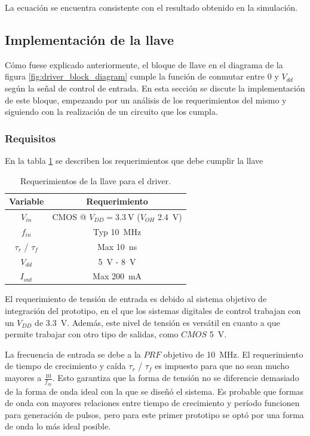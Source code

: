 La ecuación se encuentra consistente con el resultado obtenido en la simulación.

\subsection{Implementación de la llave}

Cómo fuese explicado anteriormente, el bloque de llave en el diagrama de la
figura \ref{fig:driver_block_diagram} cumple la función de conmutar entre $0$ y
$V_{dd}$ según la señal de control de entrada. En esta sección se discute la
implementación de este bloque, empezando por un análisis de los requerimientos
del mismo y siguiendo con la realización de un circuito que los cumpla.

\subsubsection{Requisitos}

En la tabla
\ref{tab:llave_requirements} se describen los requerimientos que debe cumplir la
llave

\begin{table}
\centering
\begin{tabular}{c|c}
\hline
    Variable & Requerimiento \\
\hline
    $V_{in}$                &   CMOS @ $V_{DD}=\qty{3.3}{\volt}$ ($V_{OH}$
    \qty{2.4}{\volt})     \\
    $f_{in}$                &   Typ \qty{10}{\mega\hertz} \\
    $\tau_{r}$ / $\tau_{f}$ &   Max \qty{10}{\nano\second} \\
    $V_{dd}$                &   \qty{5}{\volt} - \qty{8}{\volt} \\
    $I_{out}$               &   Max \qty{200}{\milli\ampere} \\
\hline
\end{tabular}
\caption{Requerimientos de la llave para el driver.}
\label{tab:llave_requirements}
\end{table}

El requerimiento de tensión de entrada es debido al sistema objetivo de
integración del prototipo, en el que los sistemas digitales de control trabajan
con un $V_{DD}$ de \qty{3.3}{\volt}. Además, este nivel de tensión es versátil
en cuanto a que permite trabajar con otro tipo de salidas, como $CMOS$
\qty{5}{\volt}.

La frecuencia de  entrada se debe a la $PRF$ objetivo de \qty{10}{\mega\hertz}.
El requerimiento de tiempo de crecimiento y caída $\tau_{r}$ / $\tau_{f}$ es
impuesto para que no sean mucho mayores a $\frac{10}{f_{in}}$. Esto garantiza
que la forma de tensión no se diferencie demasiado de la forma de onda ideal con
la que se diseñó el sistema. Es probable que formas de onda con mayores
relaciones entre tiempo de crecimiento y período funcionen para generación de
pulsos, pero para este primer prototipo se optó por una forma de onda lo más
ideal posible.

